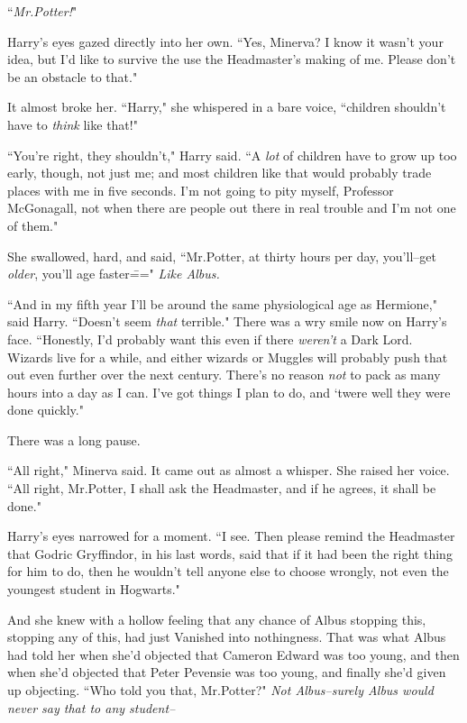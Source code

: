 ``\emph{Mr.\?Potter!}"

Harry's eyes gazed directly into her own. ``Yes, Minerva? I know it wasn't your idea, but I'd like to survive the use the Headmaster's making of me. Please don't be an obstacle to that."

It almost broke her. ``Harry," she whispered in a bare voice, ``children shouldn't have to \emph{think} like that!"

``You're right, they shouldn't," Harry said. ``A \emph{lot} of children have to grow up too early, though, not just me; and most children like that would probably trade places with me in five seconds. I'm not going to pity myself, Professor McGonagall, not when there are people out there in real trouble and I'm not one of them."

She swallowed, hard, and said, ``Mr.\?Potter, at thirty hours per day, you'll\---get \emph{older}, you'll age faster\===" \emph{Like Albus.}

``And in my fifth year I'll be around the same physiological age as Hermione," said Harry. ``Doesn't seem \emph{that} terrible." There was a wry smile now on Harry's face. ``Honestly, I'd probably want this even if there \emph{weren't} a Dark Lord. Wizards live for a while, and either wizards or Muggles will probably push that out even further over the next century. There's no reason \emph{not} to pack as many hours into a day as I can. I've got things I plan to do, and `twere well they were done quickly."

There was a long pause.

``All right," Minerva said. It came out as almost a whisper. She raised her voice. ``All right, Mr.\?Potter, I shall ask the Headmaster, and if he agrees, it shall be done."

Harry's eyes narrowed for a moment. ``I see. Then please remind the Headmaster that Godric Gryffindor, in his last words, said that if it had been the right thing for him to do, then he wouldn't tell anyone else to choose wrongly, not even the youngest student in Hogwarts."

And she knew with a hollow feeling that any chance of Albus stopping this, stopping any of this, had just Vanished into nothingness. That was what Albus had told her when she'd objected that Cameron Edward was too young, and then when she'd objected that Peter Pevensie was too young, and finally she'd given up objecting. ``Who told you that, Mr.\?Potter?" \emph{Not Albus\---surely Albus would never \emph{say} that to any student\---}

